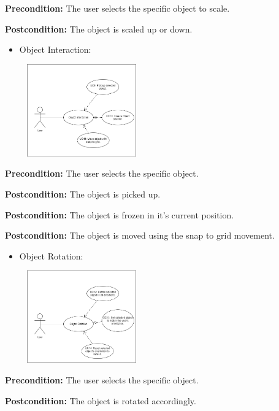 \documentclass{article}
\begin{document}
\begin{flushleft}
	\textbf{Precondition:} The user selects the specific object to scale.

	\textbf{Postcondition:} The object is scaled up or down.

	\begin{itemize}
		\item Object Interaction:
	\end{itemize}

	\begin{center}
	\includegraphics[width=250px,height=150px]{ObjectInteraction.png}
	\end{center}

	\textbf{Precondition:} The user selects the specific object.

	\textbf{Postcondition:} The object is picked up.

	\textbf{Postcondition:} The object is frozen in it's current position.

	\textbf{Postcondition:} The object is moved using the snap to grid movement.

	\begin{itemize}
		\item Object Rotation:
	\end{itemize}

	\begin{center}
	\includegraphics[width=250px,height=150px]{ObjectRotation.png}
	\end{center}

	\textbf{Precondition:} The user selects the specific object.

	\textbf{Postcondition:} The object is rotated accordingly.

	\newpage


\end{flushleft}
\end{document}
